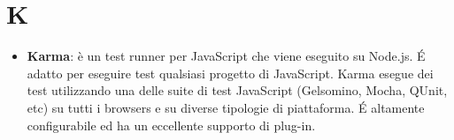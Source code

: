 \section{K}
\begin{itemize} 
	\item
	\textbf{Karma}: è un test runner per JavaScript che viene eseguito su Node.js. \'E adatto per eseguire test qualsiasi progetto di JavaScript. Karma esegue dei test utilizzando una delle suite di test JavaScript (Gelsomino, Mocha, QUnit, etc) su tutti i browsers e su diverse tipologie di piattaforma. \'E altamente configurabile ed ha un eccellente supporto di plug-in.
\end{itemize}
